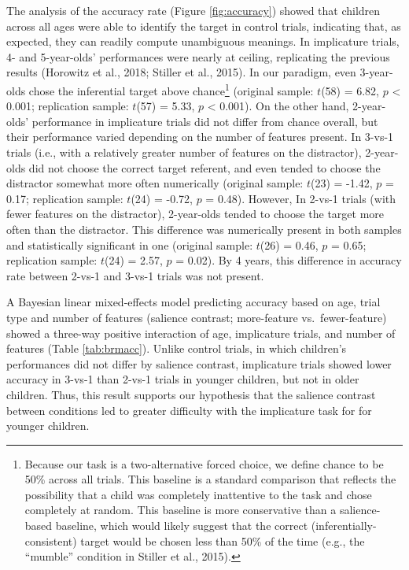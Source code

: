 \documentclass[man]{apa6}
\begin{document}
The analysis of the accuracy rate (Figure \ref{fig:accuracy}) showed
that children across all ages were able to identify the target in
control trials, indicating that, as expected, they can readily compute
unambiguous meanings. In implicature trials, 4- and 5-year-olds'
performances were nearly at ceiling, replicating the previous results
(Horowitz et al., 2018; Stiller et al., 2015). In our paradigm, even
3-year-olds chose the inferential target above chance\footnote{Because
  our task is a two-alternative forced choice, we define chance to be
  50\% across all trials. This baseline is a standard comparison that
  reflects the possibility that a child was completely inattentive to
  the task and chose completely at random. This baseline is more
  conservative than a salience-based baseline, which would likely
  suggest that the correct (inferentially-consistent) target would be
  chosen less than 50\% of the time (e.g., the \enquote{mumble}
  condition in Stiller et al., 2015).} (original sample: \(t\)(58) =
6.82, \(p\) \textless{} 0.001; replication sample: \(t\)(57) = 5.33,
\(p\) \textless{} 0.001). On the other hand, 2-year-olds' performance in
implicature trials did not differ from chance overall, but their
performance varied depending on the number of features present. In
3-vs-1 trials (i.e., with a relatively greater number of features on the
distractor), 2-year-olds did not choose the correct target referent, and
even tended to choose the distractor somewhat more often numerically
(original sample: \(t\)(23) = -1.42, \(p\) = 0.17; replication sample:
\(t\)(24) = -0.72, \(p\) = 0.48). However, In 2-vs-1 trials (with fewer
features on the distractor), 2-year-olds tended to choose the target
more often than the distractor. This difference was numerically present
in both samples and statistically significant in one (original sample:
\(t\)(26) = 0.46, \(p\) = 0.65; replication sample: \(t\)(24) = 2.57,
\(p\) = 0.02). By 4 years, this difference in accuracy rate between
2-vs-1 and 3-vs-1 trials was not present.

A Bayesian linear mixed-effects model predicting accuracy based on age,
trial type and number of features (salience contrast; more-feature
vs.~fewer-feature) showed a three-way positive interaction of age,
implicature trials, and number of features (Table \ref{tab:brmacc}).
Unlike control trials, in which children's performances did not differ
by salience contrast, implicature trials showed lower accuracy in 3-vs-1
than 2-vs-1 trials in younger children, but not in older children. Thus,
this result supports our hypothesis that the salience contrast between
conditions led to greater difficulty with the implicature task for for
younger children.
\end{document}
